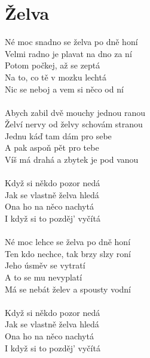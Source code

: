 \section{Želva}
Né moc snadno se želva po dně honí\\
Velmi radno je plavat na dno za ní\\
Potom počkej, až se zeptá\\
Na to, co tě v mozku lechtá\\
Nic se neboj a vem si něco od ní\\
\\
Abych zabil dvě mouchy jednou ranou\\
Želví nervy od želvy schovám stranou\\
Jednu káď tam dám pro sebe\\
A pak aspoň pět pro tebe\\
Víš má drahá a zbytek je pod vanou\\
\\
Když si někdo pozor nedá\\
Jak se vlastně želva hledá\\
Ona ho na něco nachytá\\
I když si to pozděj' vyčítá\\
\\
Né moc lehce se želva po dně honí\\
Ten kdo nechce, tak brzy slzy roní\\
Jeho úsměv se vytratí\\
A to se mu nevyplatí\\
Má se nebát želev a spousty vodní\\
\\
Když si někdo pozor nedá\\
Jak se vlastně želva hledá\\
Ona ho na něco nachytá\\
I když si to pozděj' vyčítá\\